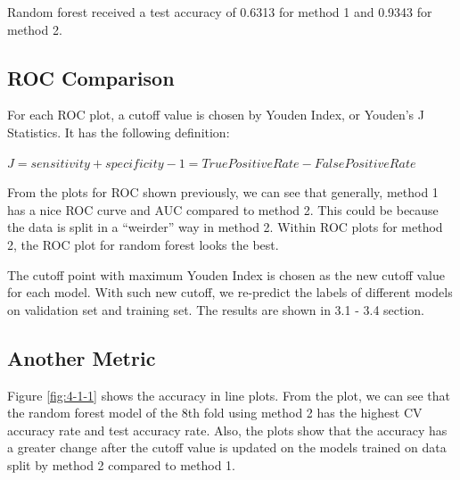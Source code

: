 \documentclass[11pt]{article}
\begin{document}
Random forest received a test accuracy of 0.6313 for method 1 and 0.9343 for method 2.


\subsection{ROC Comparison}

For each ROC plot, a cutoff value is chosen by Youden Index, or Youden's J Statistics. It has the following definition:

$
J = sensitivity + specificity - 1 = True Positive Rate - False Positive Rate 
$

From the plots for ROC shown previously, we can see that generally, method 1 has a nice ROC curve and AUC compared to method 2. This could be because the data is split in a ``weirder'' way in method 2. Within ROC plots for method 2, the ROC plot for random forest looks the best.

The cutoff point with maximum Youden Index is chosen as the new cutoff value for each model. With such new cutoff, we re-predict the labels of different models on validation set and training set. The results are shown in 3.1 - 3.4 section.

\subsection{Another Metric}


Figure \ref{fig:4-1-1} shows the accuracy in line plots. From the plot, we can see that the random forest model of the 8th fold using method 2 has the highest CV accuracy rate and test accuracy rate. Also, the plots show that the accuracy has a greater change after the cutoff value is updated on the models trained on data split by method 2 compared to method 1.
\end{document}
